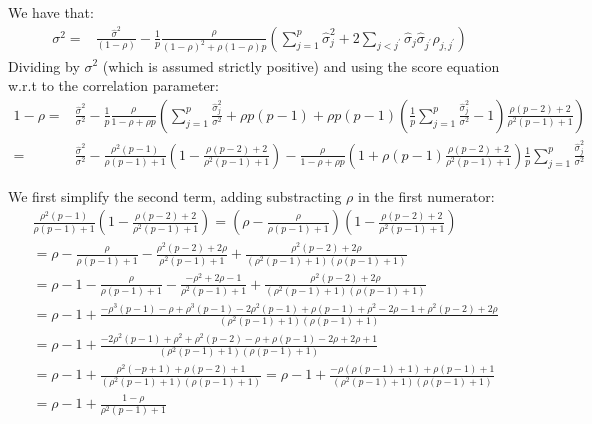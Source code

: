 \documentclass[12pt]{article}
\begin{document}
We have that:
\begin{align*}
\sigma^2 =& \frac{\widehat{\sigma}^2}{(1- \rho)}  - \frac{1}{p}\frac{\rho}{(1-\rho)^2+\rho(1-\rho)p} \left(\sum_{j=1}^p \widehat{\sigma}^2_j + 2\sum_{j < j^{\prime}}\widehat{\sigma}_j \widehat{\sigma}_{j^{\prime}}\widehat{\rho}_{j,j^{\prime}}\right)
\end{align*}
Dividing by \(\sigma^2\) (which is assumed strictly positive) and
using the score equation w.r.t to the correlation parameter:
\begin{align*}
1- \rho =& \frac{\widehat{\sigma}^2}{\sigma^2}  - \frac{1}{p}\frac{\rho}{1-\rho+\rho p} \left(\sum_{j=1}^p \frac{\widehat{\sigma}^2_j}{\sigma^2} + \rho p (p-1) + \rho p (p-1) \left(\frac{1}{p}\sum_{j=1}^p \frac{\widehat{\sigma}^2_j}{\sigma^2} - 1\right) \frac{\rho(p-2)  + 2}{\rho^2(p-1) + 1}\right) \\
 =& \frac{\widehat{\sigma}^2}{\sigma^2}  - \frac{\rho^2(p-1)}{\rho(p-1)+1} \left(1 - \frac{\rho(p-2)  + 2}{\rho^2(p-1) + 1} \right) - \frac{\rho}{1-\rho+\rho p} \left(1 + \rho (p-1) \frac{\rho(p-2)  + 2}{\rho^2(p-1) + 1} \right) \frac{1}{p} \sum_{j=1}^p \frac{\widehat{\sigma}^2_j}{\sigma^2} 
\end{align*}


We first simplify the second term, adding substracting \(\rho\) in the first numerator:
\begin{align*}
& \frac{\rho^2(p-1)}{\rho(p-1)+1} \left(1 - \frac{\rho(p-2)  + 2}{\rho^2(p-1) + 1} \right)
=  \left(\rho - \frac{\rho}{\rho(p-1)+1}\right)\left(1 - \frac{\rho(p-2)  + 2}{\rho^2(p-1) + 1} \right) \\
&=  \rho - \frac{\rho}{\rho(p-1)+1} -  \frac{\rho^2(p-2)  + 2\rho}{\rho^2(p-1) + 1} +  \frac{\rho^2(p-2)  + 2\rho}{(\rho^2(p-1) + 1)(\rho(p-1)+1)} \\
&=  \rho - 1 - \frac{\rho}{\rho(p-1)+1} -  \frac{-\rho^2 + 2\rho - 1}{\rho^2(p-1) + 1} +  \frac{\rho^2(p-2)  + 2\rho}{(\rho^2(p-1) + 1)(\rho(p-1)+1)}  \\
&=  \rho - 1 + \frac{- \rho^3 (p-1) - \rho + \rho^3(p-1) - 2\rho^2(p-1)+\rho(p-1)+\rho^2-2\rho-1 + \rho^2(p-2)  + 2\rho}{(\rho^2(p-1) + 1)(\rho(p-1)+1)}  \\
&=  \rho - 1 + \frac{-2\rho^2(p-1)+\rho^2 + \rho^2(p-2)- \rho +\rho(p-1)-2\rho  + 2\rho +1 }{(\rho^2(p-1) + 1)(\rho(p-1)+1)}  \\
&=  \rho - 1 + \frac{\rho^2(-p+1) + \rho(p-2) +1 }{(\rho^2(p-1) + 1)(\rho(p-1)+1)} =  \rho - 1 + \frac{-\rho(\rho (p-1) +1) + \rho(p-1) +1 }{(\rho^2(p-1) + 1)(\rho(p-1)+1)} \\
&=  \rho - 1 + \frac{1-\rho}{\rho^2(p-1) + 1} 
\end{align*}
\end{document}
